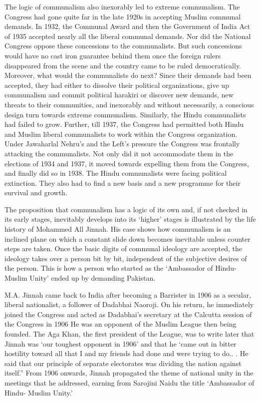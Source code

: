 The logic of communalism also inexorably led to extreme communalism. The Congress had gone quite far in the late 1920s in accepting Muslim communal demands. In 1932, the Communal Award and then the Government of India Act of 1935 accepted nearly all the liberal communal demands. Nor did the National Congress oppose these concessions to the communalists. But such concessions would have no cast iron guarantee behind them once the foreign rulers disappeared from the scene and the country came to be ruled democratically. Moreover, what would the communalists do next? Since their demands had been accepted, they had either to dissolve their political organizations, give up communalism and commit political harakiri or discover new demands, new threats to their communities, and inexorably and without necessarily, a conscious design turn towards extreme communalism. Similarly, the Hindu communalists had failed to grow. Further, till 1937, the Congress had permitted both Hindu and Muslim liberal communalists to work within the Congress organization. Under Jawaharlal Nehru’s and the Left’s pressure the Congress was frontally attacking the communalists. Not only did it not accommodate them in the elections of 1934 and 1937, it moved towards expelling them from the Congress, and finally did so in 1938. The Hindu communalists were facing political extinction. They also had to find a new basis and a new programme for their survival and growth. 

The proposition that communalism has a logic of its own and, if not checked in its early stages, inevitably develops into its ‘higher’ stages is illustrated by the life history of Mohammed All Jinnah. His case shows how communalism is an inclined plane on which a constant slide down becomes inevitable unless counter steps are taken. Once the basic digits of communal ideology are accepted, the ideology takes over a person bit by bit, independent of the subjective desires of the person. This is how a person who started as the ‘Ambassador of Hindu-Muslim Unity’ ended up by demanding Pakistan. 

M.A. Jinnah came back to India after becoming a Barrister in 1906 as a secular, liberal nationalist, a follower of Dadabhai Naoroji. On his return, he immediately joined the Congress and acted as Dadabhai’s secretary at the Calcutta session of the Congress in 1906 He was an opponent of the Muslim League then being founded. The Aga Khan, the first president of the League, was to write later that Jinnah was ‘our toughest opponent in 1906’ and that he ‘came out in bitter hostility toward all that I and my friends had done and were trying to do.. . He said that our principle of separate electorates was dividing the nation against itself.” From 1906 onwards, Jinnah propagated the theme of national unity in the meetings that he addressed, earning from Sarojini Naidu the title ‘Ambassador of Hindu- Muslim Unity.’ 

